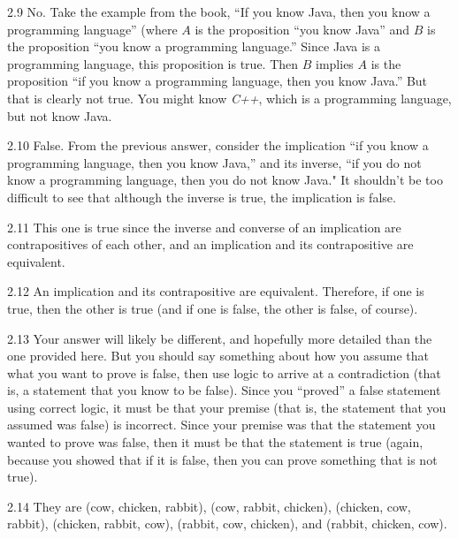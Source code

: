 \begin{RequAnswer}{2.9}
No.
Take the example from the book, ``If you know Java, then you know a programming language'' (where $A$ is the proposition
``you know Java'' and $B$ is the proposition ``you know a programming language.''
Since Java is a programming language, this proposition is true.
Then $B$ implies $A$ is the proposition ``if you know a programming language, then you know Java.'' But that is clearly not
true. You might know {\em C++}, which is a programming language, but not know Java.
\end{RequAnswer}
\begin{RequAnswer}{2.10}
False. From the previous answer, consider the implication ``if you know a programming language, then you know Java,''
and its inverse, ``if you do not know a programming language, then you do not know Java."
It shouldn't be too difficult to see that although the inverse is true, the implication is false.
\end{RequAnswer}
\begin{RequAnswer}{2.11}
This one is true since the inverse and converse of an implication are contrapositives of each other, and an implication
and its contrapositive are equivalent.
\end{RequAnswer}
\begin{RequAnswer}{2.12}
An implication and its contrapositive are equivalent.
Therefore, if one is true, then the other is true
(and if one is false, the other is false, of course).
\end{RequAnswer}
\begin{RequAnswer}{2.13}
Your answer will likely be different, and hopefully more detailed than the one provided here.
But you should say something about how you assume that what you want to prove is false,
then use logic to arrive at a contradiction (that is, a statement that you know to be false).
Since you ``proved'' a false statement using correct logic, it must be that your premise (that is,
the statement that you assumed was false) is incorrect. Since your premise was that the statement
you wanted to prove was false, then it must be that the statement is true (again, because you
showed that if it is false, then you can prove something that is not true).
\end{RequAnswer}
\begin{RequAnswer}{2.14}
They are
(cow, chicken, rabbit),
(cow, rabbit, chicken),
(chicken, cow, rabbit),
(chicken, rabbit, cow),
(rabbit, cow, chicken), and
(rabbit, chicken, cow).
\end{RequAnswer}
